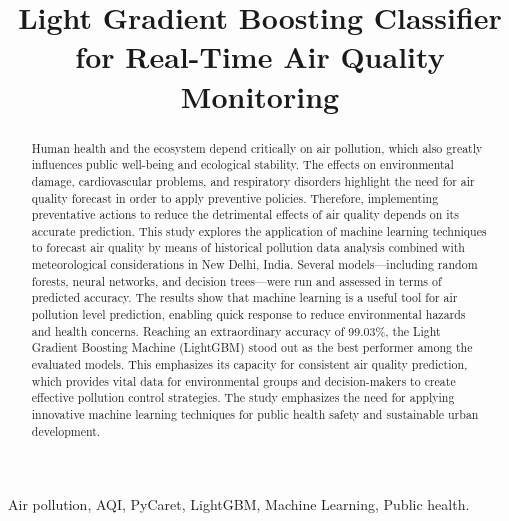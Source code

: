 \documentclass[conference]{IEEEtran}
\begin{document}
\title{Light Gradient Boosting Classifier for Real-Time Air Quality Monitoring
}

\maketitle

\begin{abstract}
Human health and the ecosystem depend critically on air pollution, which also greatly influences public well-being and ecological stability. The effects on environmental damage, cardiovascular problems, and respiratory disorders highlight the need for air quality forecast in order to apply preventive policies. Therefore, implementing preventative actions to reduce the detrimental effects of air quality depends on its accurate prediction.  This study explores the application of machine learning techniques to forecast air quality by means of historical pollution data analysis combined with meteorological considerations in New Delhi, India. Several models—including random forests, neural networks, and decision trees—were run and assessed in terms of predicted accuracy. The results show that machine learning is a useful tool for air pollution level prediction, enabling quick response to reduce environmental hazards and health concerns.  Reaching an extraordinary accuracy of 99.03\%, the Light Gradient Boosting Machine (LightGBM) stood out as the best performer among the evaluated models. This emphasizes its capacity for consistent air quality prediction, which provides vital data for environmental groups and decision-makers to create effective pollution control strategies. The study emphasizes the need for applying innovative machine learning techniques for public health safety and sustainable urban development.
\end{abstract}

\begin{IEEEkeywords}
Air pollution, AQI, PyCaret, LightGBM, Machine Learning, Public health.
\end{IEEEkeywords}
\end{document}
